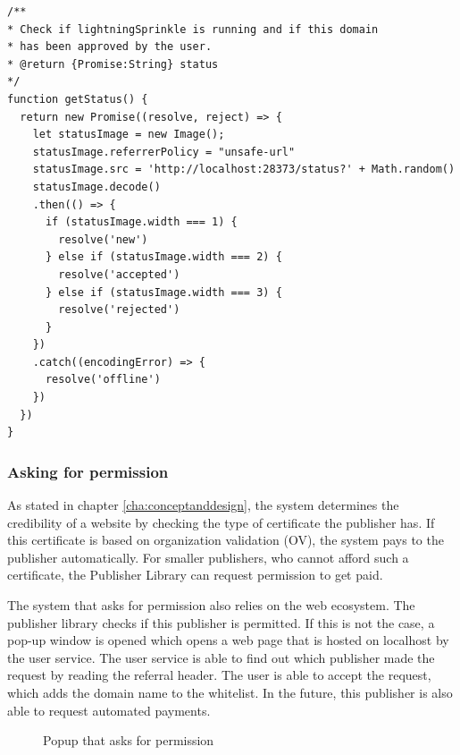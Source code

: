 \lstset{language=Javascript}
\lstset{frame=lines}
\lstset{basicstyle=\footnotesize}
\begin{lstlisting}
/**
* Check if lightningSprinkle is running and if this domain 
* has been approved by the user.
* @return {Promise:String} status
*/
function getStatus() {
  return new Promise((resolve, reject) => {
    let statusImage = new Image();
    statusImage.referrerPolicy = "unsafe-url"
    statusImage.src = 'http://localhost:28373/status?' + Math.random()
    statusImage.decode()
    .then(() => {
      if (statusImage.width === 1) {
        resolve('new')
      } else if (statusImage.width === 2) {
        resolve('accepted')
      } else if (statusImage.width === 3) {
        resolve('rejected')
      }
    })
    .catch((encodingError) => {
      resolve('offline')
    })
  })
}
\end{lstlisting}

\subsubsection{Asking for permission}
As stated in chapter \ref{cha:conceptanddesign}, the system determines the credibility of a website by checking the type of certificate the publisher has. If this certificate is based on organization validation (OV), the system pays to the publisher automatically. For smaller publishers, who cannot afford such a certificate, the Publisher Library can request permission to get paid. 

The system that asks for permission also relies on the web ecosystem. The publisher library checks if this publisher is permitted. If this is not the case, a pop-up window is opened which opens a web page that is hosted on localhost by the user service. The user service is able to find out which publisher made the request by reading the referral header. The user is able to accept the request, which adds the domain name to the whitelist. In the future, this publisher is also able to request automated payments.

\begin{figure}[h!]
  \setlength{\fboxsep}{0pt}%
  \caption{Popup that asks for permission}
\end{figure}

